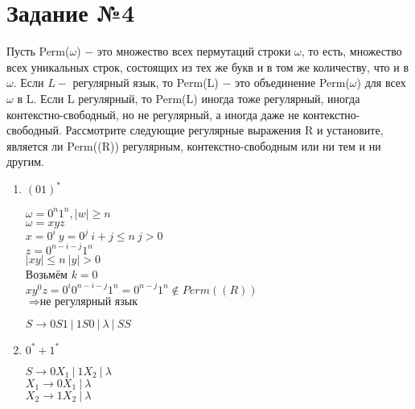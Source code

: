 \documentclass{article}
\begin{document}
    \section*{\huge{Задание №4}}
        \LARGE
        Пусть Perm($\omega$) $ - $ это множество всех пермутаций строки $\omega$, то есть, множество всех уникальных строк, состоящих из тех же букв и в том же количеству, что и в $\omega$. Если $L - $ регулярный язык, то Perm(L) $ - $ это объединение Perm($\omega$) для всех $\omega$ в L. Если L регулярный, то Perm(L) иногда тоже регулярный, иногда контекстно-свободный, но не регулярный, а иногда даже не контекстно-свободный. Рассмотрите следующие регулярные выражения R и установите, является ли Perm((R)) регулярным, контекстно-свободным или ни тем и ни другим.
        \begin{enumerate}
            \item $(01)^*$ \\
            
                \begin{center}
                    $\omega = 0^n 1^n, |w| \geq n$ \\
                    $\omega = xyz$ \\
                    $x = 0^i \  y = 0^j \  i + j \leq n \  j > 0$ \\
                    $z = 0^{n-i-j} 1^n$ \\
                    $|xy| \leq n \  |y| > 0$ \\
                    Возьмём $k = 0$ \\
                    $xy^0z = 0^i 0^{n-i-j} 1^n = 0^{n-j} 1^n \notin Perm((R))$ \\
                    $\Rightarrow \textbf{не регулярный язык}$
                \end{center}
                
                $S \rightarrow 0S1 \ | \ 1S0 \ | \ \lambda \ | \ SS$ \\
            
            \item $0^* + 1^*$ \\
            
                \begin{center}
                \end{center}
                $S \rightarrow 0X_1 \ | \ 1X_2 \ | \ \lambda$ \\
                $X_1 \rightarrow 0X_1 \ | \ \lambda$ \\
                $X_2 \rightarrow 1X_2 \ | \ \lambda$ \\
                

\end{enumerate}
\end{document}
